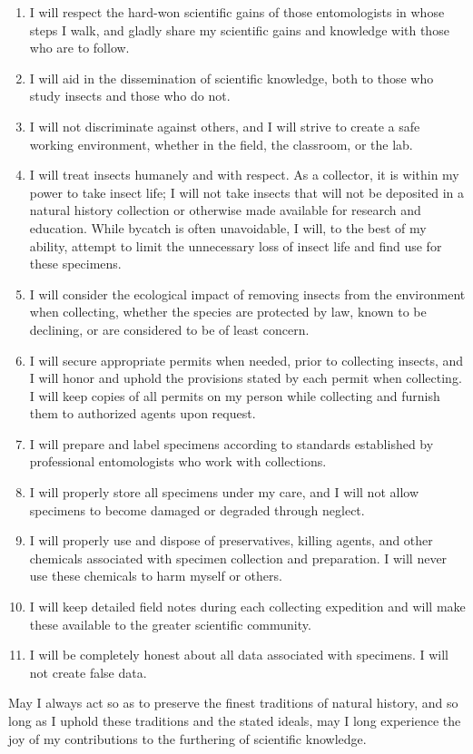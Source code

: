 \documentclass[letterpaper, 10pt]{article}
\begin{document}
\begin{enumerate}
\item I will respect the hard-won scientific gains of those entomologists in whose steps I walk, and gladly share my scientific gains and knowledge with those who are to follow.
\item I will aid in the dissemination of scientific knowledge, both to those who study insects and those who do not.
\item I will not discriminate against others, and I will strive to create a safe working environment, whether in the field, the classroom, or the lab.
\item I will treat insects humanely and with respect. As a collector, it is within my power to take insect life; I will not take insects that will not be deposited in a natural history collection or otherwise made available for research and education. While bycatch is often unavoidable, I will, to the best of my ability, attempt to limit the unnecessary loss of insect life and find use for these specimens.  
\item I will consider the ecological impact of removing insects from the environment when collecting, whether the species are protected by law, known to be declining, or are considered to be of least concern.
\item I will secure appropriate permits when needed, prior to collecting insects, and I will honor and uphold the provisions stated by each permit when collecting. I will keep copies of all permits on my person while collecting and furnish them to authorized agents upon request.
\item I will prepare and label specimens according to standards established by professional entomologists who work with collections. 
\item I will properly store all specimens under my care, and I will not allow specimens to become damaged or degraded through neglect.
\item I will properly use and dispose of preservatives, killing agents, and other chemicals associated with specimen collection and preparation. I will never use these chemicals to harm myself or others.
\item I will keep detailed field notes during each collecting expedition and will make these available to the greater scientific community. 
\item I will be completely honest about all data associated with specimens. I will not create false data.
\end{enumerate}
 
\noindent{}May I always act so as to preserve the finest traditions of natural history, and so long as I uphold  these traditions and the stated ideals, may I long experience the joy of my contributions to the furthering of scientific knowledge. 
\end{document}
